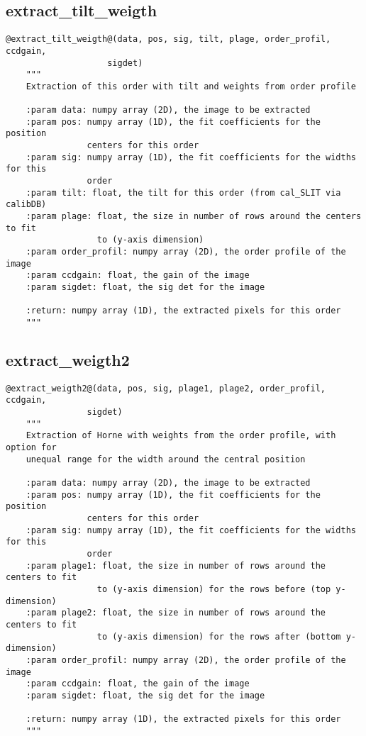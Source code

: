 \subsection{extract\_tilt\_weigth}
\begin{lstlisting}[style=pythonstyle]
@extract_tilt_weigth@(data, pos, sig, tilt, plage, order_profil, ccdgain,
                    sigdet)
    """
    Extraction of this order with tilt and weights from order profile
    
    :param data: numpy array (2D), the image to be extracted
    :param pos: numpy array (1D), the fit coefficients for the position
                centers for this order
    :param sig: numpy array (1D), the fit coefficients for the widths for this
                order
    :param tilt: float, the tilt for this order (from cal_SLIT via calibDB)
    :param plage: float, the size in number of rows around the centers to fit
                  to (y-axis dimension)
    :param order_profil: numpy array (2D), the order profile of the image
    :param ccdgain: float, the gain of the image
    :param sigdet: float, the sig det for the image

    :return: numpy array (1D), the extracted pixels for this order
    """
\end{lstlisting}

\subsection{extract\_weigth2}
\begin{lstlisting}[style=pythonstyle]
@extract_weigth2@(data, pos, sig, plage1, plage2, order_profil, ccdgain,
                sigdet)
    """
    Extraction of Horne with weights from the order profile, with option for
    unequal range for the width around the central position

    :param data: numpy array (2D), the image to be extracted
    :param pos: numpy array (1D), the fit coefficients for the position
                centers for this order
    :param sig: numpy array (1D), the fit coefficients for the widths for this
                order
    :param plage1: float, the size in number of rows around the centers to fit
                  to (y-axis dimension) for the rows before (top y-dimension)
    :param plage2: float, the size in number of rows around the centers to fit
                  to (y-axis dimension) for the rows after (bottom y-dimension)
    :param order_profil: numpy array (2D), the order profile of the image
    :param ccdgain: float, the gain of the image
    :param sigdet: float, the sig det for the image

    :return: numpy array (1D), the extracted pixels for this order
    """
\end{lstlisting}

